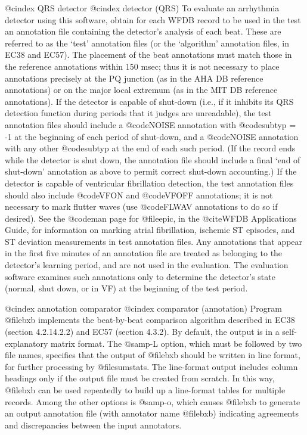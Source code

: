 {{{{{{{{@cindex QRS detector
@cindex detector (QRS)
To evaluate an arrhythmia detector using this software, obtain for each
WFDB record to be used in the test an annotation file containing the
detector's analysis of each beat.  These are referred to as the `test'
annotation files (or the `algorithm' annotation files, in EC38 and EC57).
The placement of the beat annotations must match those in the reference
annotations within 150 msec; thus it is not necessary to place
annotations precisely at the PQ junction (as in the AHA DB reference
annotations) or on the major local extremum (as in the MIT DB reference
annotations).  If the detector is capable of shut-down (i.e., if it
inhibits its QRS detection function during periods that it judges are
unreadable), the test annotation files should include a @code{NOISE}
annotation with @code{subtyp = -1} at the beginning of each period of
shut-down, and a @code{NOISE} annotation with any other @code{subtyp}
at the end of each such period.  (If the record ends while the detector
is shut down, the annotation file should include a final `end of shut-down'
annotation as above to permit correct shut-down accounting.)  If the
detector is capable of ventricular fibrillation detection, the test
annotation files should also include @code{VFON} and @code{VFOFF}
annotations; it is not necessary to mark flutter waves (use @code{FLWAV}
annotations to do so if desired).  See the @code{man} page for @file{epic},
in the @cite{WFDB Applications Guide}, for information on marking
atrial fibrillation, ischemic ST episodes, and ST deviation measurements
in test annotation files.  Any annotations that appear in the
first five minutes of an annotation file are treated as belonging to the
detector's learning period, and are not used in the evaluation.  The
evaluation software examines such annotations only to determine the
detector's state (normal, shut down, or in VF) at the beginning of the
test period.

@cindex annotation comparator
@cindex comparator (annotation)
Program @file{bxb} implements the beat-by-beat comparison algorithm described
in EC38 (section 4.2.14.2.2) and EC57 (section 4.3.2).  By default, the output
is in a self-explanatory matrix format.  The @samp{-L} option, which must be
followed by two file names, specifies that the output of @file{bxb} should be
written in line format, for further processing by @file{sumstats}.  The
line-format output includes column headings only if the output file must be
created from scratch.  In this way, @file{bxb} can be used repeatedly to build
up a line-format tables for multiple records.  Among the other options is
@samp{-o}, which causes @file{bxb} to generate an output annotation file (with
annotator name @file{bxb}) indicating agreements and discrepancies between the
input annotators.

}}}}}}}}
